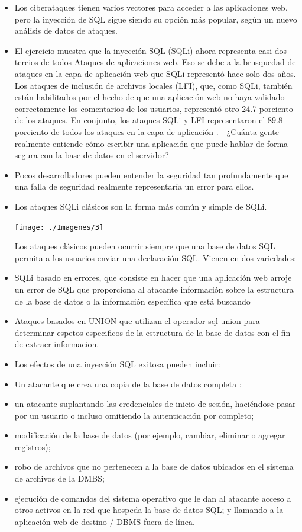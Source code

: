 \documentclass[%
 reprint,
 amsmath,amssymb,
 aps,
]{revtex4-1}
\begin{document}
\begin{itemize}
           \item Los ciberataques tienen varios vectores para acceder a las aplicaciones web, pero la inyección de SQL sigue siendo su opción más popular, según un nuevo análisis de datos de ataques.
           \item El ejercicio muestra que la inyección SQL (SQLi) ahora representa casi dos tercios   de todos Ataques de aplicaciones web. Eso se debe a la brusquedad de ataques en la  capa de aplicación web que SQLi representó hace solo dos años.
Los ataques de inclusión de archivos locales (LFI), que, como SQLi, también están habilitados por el hecho de que una aplicación web no haya validado correctamente los comentarios de los usuarios, representó otro 24.7 porciento de los ataques. En conjunto, los ataques SQLi y LFI representaron el 89.8 porciento de todos los ataques en la capa de aplicación .
- ¿Cuánta gente realmente entiende cómo escribir una aplicación que puede hablar de forma segura con la base de datos en el servidor?
 \item Pocos desarrolladores pueden entender la seguridad tan profundamente que una falla de seguridad realmente representaría un error para ellos.
\item  Los ataques SQLi clásicos son la forma más común y simple de SQLi.
\begin{center}
	\texttt{[image: ./Imagenes/3]}
\end{center}	

Los ataques clásicos pueden ocurrir siempre que una base de datos SQL permita a los usuarios enviar una declaración SQL. Vienen en dos variedades:

\item SQLi basado en errores, que consiste en hacer que una aplicación web arroje un error de SQL que proporciona al atacante información sobre la estructura de la base de datos o la información específica que está buscando
\item Ataques basados  en UNION que utilizan el operador sql union para determinar espetos especificos de la estructura de la base de datos con el fin de extraer informacion.
\item Los efectos de una inyección SQL exitosa pueden incluir:
\item Un atacante que crea una copia de la base de datos completa ;
\item un atacante suplantando las credenciales de inicio de sesión, haciéndose pasar por un usuario o incluso omitiendo la autenticación por completo;
\item modificación de la base de datos (por ejemplo, cambiar, eliminar o agregar registros);
\item robo de archivos que no pertenecen a la base de datos ubicados en el sistema de archivos de la DMBS;
\item ejecución de comandos del sistema operativo que le dan al atacante acceso a otros activos en la red que hospeda la base de datos SQL; y llamando a la aplicación web de destino / DBMS fuera de línea.

\end{itemize}
\end{document}
